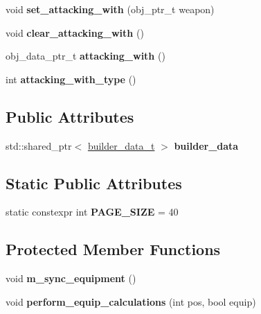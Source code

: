 \begin{DoxyCompactItemize}
void {\bfseries set\+\_\+attacking\+\_\+with} (obj\+\_\+ptr\+\_\+t weapon)
\item 
\mbox{\label{classmods_1_1player_acee88346f8e1bba25d38fcad0527ab3a}} 
void {\bfseries clear\+\_\+attacking\+\_\+with} ()
\item 
\mbox{\label{classmods_1_1player_a674798a3d890110e2aa3d5c52ae579b8}} 
obj\+\_\+data\+\_\+ptr\+\_\+t {\bfseries attacking\+\_\+with} ()
\item 
\mbox{\label{classmods_1_1player_aa35eeea77aca8368ef6e9909e22254ff}} 
int {\bfseries attacking\+\_\+with\+\_\+type} ()
\end{DoxyCompactItemize}
\subsection*{Public Attributes}
\begin{DoxyCompactItemize}
\item 
\mbox{\label{classmods_1_1player_a92bf949e9017cba7e15ceeddeecabd6e}} 
std\+::shared\+\_\+ptr$<$ \hyperlink{structbuilder__data__t}{builder\+\_\+data\+\_\+t} $>$ {\bfseries builder\+\_\+data}
\end{DoxyCompactItemize}
\subsection*{Static Public Attributes}
\begin{DoxyCompactItemize}
\item 
\mbox{\label{classmods_1_1player_aaf1125ed813eb65509e04724182ac6d0}} 
static constexpr int {\bfseries P\+A\+G\+E\+\_\+\+S\+I\+ZE} = 40
\end{DoxyCompactItemize}
\subsection*{Protected Member Functions}
\begin{DoxyCompactItemize}
\item 
\mbox{\label{classmods_1_1player_a0af7899634f32acfecdfe05dced66ac1}} 
void {\bfseries m\+\_\+sync\+\_\+equipment} ()
\item 
\mbox{\label{classmods_1_1player_ac69cc3d275e1df592b20ee19d072de56}} 
void {\bfseries perform\+\_\+equip\+\_\+calculations} (int pos, bool equip)
\end{DoxyCompactItemize}
